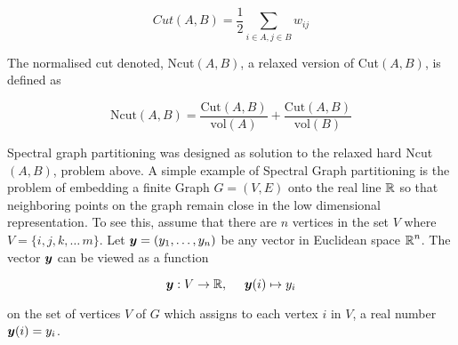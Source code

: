 \begin{equation}\label{cut}
Cut(A,B) = \displaystyle \frac{1}{2} \sum_{i \in A,  j \in B } w_{ij} 
\end{equation}


The normalised cut denoted, Ncut$(A,B)$, a relaxed version of Cut$(A, B)$, is defined as

\begin{equation}\label{Ncut}
\displaystyle \text{Ncut}(A,B) = \frac{\text{Cut}(A, B)}{\text{vol}(A)}
+ \frac{\text{Cut}(A, B)}{\text{vol}(B)} 
\end{equation}

Spectral graph partitioning\cite{Luxburg2007} was designed as solution to the relaxed hard Ncut$(A, B)$, problem above.
A simple example of Spectral Graph partitioning is the problem of embedding a finite Graph $G=(V,E)$ onto the real line $\operatorname{\mathbb{R}}$ so that neighboring points on the graph remain  close in the low dimensional representation. To see this, assume that there are $n$ vertices in the set $V$ where $V = \{i, j, k, \ldots\, m\}.$
Let $\boldsymbol{y} = (y_{1}, \ldots, y_{n})$  be any vector in Euclidean space $\operatorname{\mathbb{R}}^{n}$. The vector $\boldsymbol{y}$ can be viewed as a function

\[ \vect{y}: V \rightarrow \mathbb{R}, \ \  \ \  \vect{y}(i) \mapsto y_i \]

on the set of vertices $V$ of $G$ which assigns to each vertex $i$ in $V$, a real number $\boldsymbol{y}(i) = y_{i}$.  

